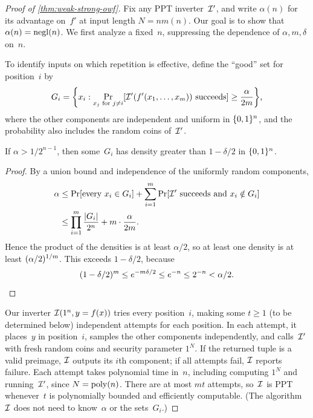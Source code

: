 \documentclass[11pt]{article}
\begin{document}
\begin{proof}[Proof of \cref{thm:weak-strong-owf}]
  Fix any PPT inverter~$\mathcal{I}'$, and write $\alpha(n)$ for its advantage on~$f'$ at input length $N=nm(n)$.
  Our goal is to show that $\alpha(n)=\operatorname{negl}(n)$.
  We first analyze a fixed~$n$, suppressing the dependence of $\alpha,m,\delta$ on~$n$.

  To identify inputs on which repetition is effective, define the ``good'' set for position~$i$ by
  \[
    G_i=\set*{x_i : \Pr_{x_j\text{ for }j\neq i}\bracks*{\Inv'(f'(x_1,\ldots,x_m))\text{ succeeds}}\geq\frac{\alpha}{2m}}\text,
  \]
  where the other components are independent and uniform in $\{0,1\}^n$, and the probability also includes the random coins of~$\mathcal{I}'$.

  \begin{claim}
    \label{claim:good-dense}
    If $\alpha>1/2^{n-1}$, then some~$G_i$ has density greater than $1-\delta/2$ in $\{0,1\}^n$.
  \end{claim}

  \begin{proof}
    By a union bound and independence of the uniformly random components,
    \[
      \begin{aligned}
        \alpha
        &\leq \Pr[\text{every }x_i\in G_i]
          +\sum_{i=1}^m\Pr[\mathcal{I}'\text{ succeeds and }x_i\notin G_i] \\
        &\leq \prod_{i=1}^m\frac{\lvert G_i\rvert}{2^n}+m\cdot\frac{\alpha}{2m}\text.
      \end{aligned}
    \]
    Hence the product of the densities is at least $\alpha/2$, so at least one density is at least $(\alpha/2)^{1/m}$.
    This exceeds $1-\delta/2$, because
    \[
      (1-\delta/2)^m\leq e^{-m\delta/2}\leq e^{-n}\leq 2^{-n}<\alpha/2\text.
    \]
  \end{proof}

  Our inverter $\mathcal{I}(1^{n}, y=f(x))$ tries every position~$i$, making some $t\geq1$ (to be determined below) independent attempts for each position.
  In each attempt, it places~$y$ in position~$i$, samples the other components independently, and calls~$\mathcal{I}'$ with fresh random coins and security parameter $1^N$.
  If the returned tuple is a valid preimage, $\mathcal{I}$ outputs its $i$th component; if all attempts fail, $\mathcal{I}$ reports failure.
  Each attempt takes polynomial time in~$n$, including computing $1^N$ and running~$\mathcal{I}'$, since $N=\operatorname{poly}(n)$.
  There are at most $mt$ attempts, so~$\mathcal{I}$ is PPT whenever~$t$ is polynomially bounded and efficiently computable.
  (The algorithm~$\mathcal{I}$ does not need to know~$\alpha$ or the sets~$G_i$.)


\end{proof}
\end{document}
